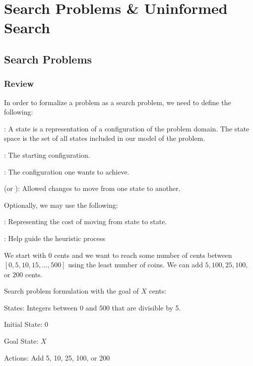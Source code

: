 \chapter{Search Problems \& Uninformed Search}

\section{Search Problems}

\subsection{Review}

In order to formalize a problem as a search problem, we need to define the following:

\begin{listo}
    \item {}: A state is a representation of a configuration of the problem domain. The state space is the set of all states included in our model of the problem.
    \item {}: The starting configuration.
    \item {}: The configuration one wants to achieve. 
    \item {} (or ): Allowed changes to move from one state to another.
\end{listo}

Optionally, we may use the following:
\begin{listo}
    \item {}: Representing the cost of moving from state to state.
    \item {}: Help guide the heuristic process
\end{listo}

\begin{example}
    We start with $0$ cents and we want to reach some number of cents between $[0, 5, 10, 15, ..., 500]$ using the least number of coins. We can add $5, 100, 25, 100$, or $200$ cents.

    Search problem formulation with the goal of $X$ cents:
    \begin{listu}
        \item States: Integers between 0 and 500 that are divisible by 5.
        \item Initial State: 0
        \item Goal State: $X$
        \item Actions: Add 5, 10, 25, 100, or 200
    \end{listu}
\end{example}

